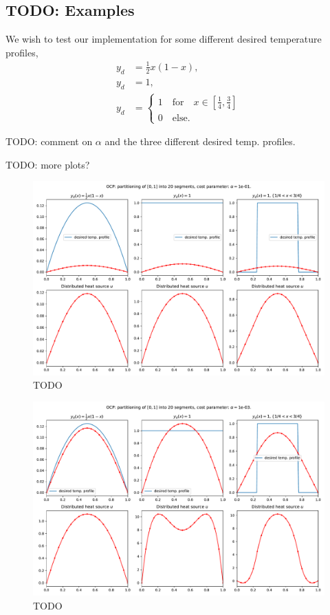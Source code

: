 \subsection{TODO: Examples}
We wish to test our implementation for some different desired temperature profiles,
\begin{align}
    \label{eq:desired_profiles}
    y_d &= \frac{1}{2}x(1-x), \\
    y_d &= 1, \\
    y_d &= \begin{cases}
        1 \quad \text{for} \quad x \in \left[ \frac{1}{4}, \frac{3}{4}\right] \\
        0 \quad \text{else}.
    \end{cases}
\end{align}


TODO: comment on \( \alpha \) and the three different desired temp. profiles.

TODO: more plots?


\begin{figure}[!h]
  \centering
  \includegraphics[width=\textwidth]{Images/plots/task2_fig_0.pdf}
  \caption{TODO}
  \label{fig:0}
\end{figure}

\begin{figure}[!h]
  \centering
  \includegraphics[width=\textwidth]{Images/plots/task2_fig_1.pdf}
  \caption{TODO}
  \label{fig:1}
\end{figure}

